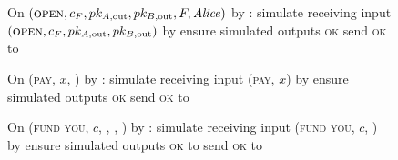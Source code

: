\begin{figure}[H]
  \begin{simulatorbox}{\simulator}
    \begin{algorithmic}[1]
      \State On $(\textsc{open}, c_F, pk_{A, \mathrm{out}}, pk_{B,
      \mathrm{out}}, F, \mathit{Alice})$ by \fchan:
      \Indent
        \State simulate \alice receiving input $(\textsc{open}, c_F, pk_{A,
        \mathrm{out}}, pk_{B, \mathrm{out}})$ by \environment
        \State ensure simulated \alice outputs \textsc{ok}
        \State send \textsc{ok} to \fchan
      \EndIndent
      \Statex

      \State On (\textsc{pay}, $x$, \dave) by \fchan:
      \Indent
        \State simulate \dave receiving input (\textsc{pay}, $x$) by \environment
        \State ensure simulated \dave outputs \textsc{ok}
        \State send \textsc{ok} to \fchan
      \EndIndent
      \Statex

      \State On (\textsc{fund you}, $c$, \bob, \charlie, \alice) by \fchan:
      \Indent
        \State simulate \alice receiving input (\textsc{fund you}, $c$, \bob) by
        \charlie
        \State ensure simulated \alice outputs \textsc{ok} to \charlie
        \State send \textsc{ok} to \fchan
      \EndIndent
    \end{algorithmic}
  \end{simulatorbox}
  \caption{}
  \label{code:simulator}
\end{figure}
